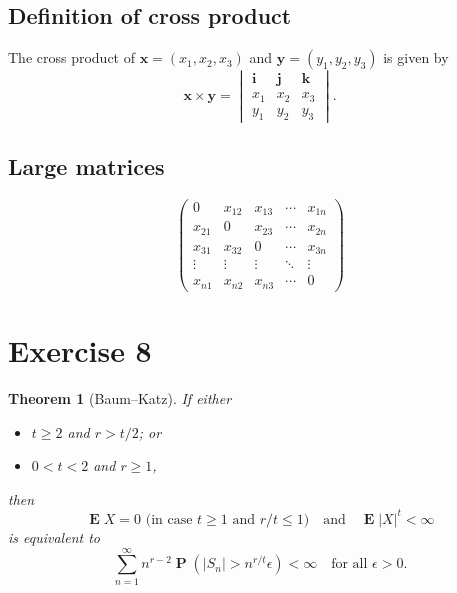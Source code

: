 \documentclass{amsart}
\DeclareMathOperator{\E}{\mathbf{E}}
\DeclareMathOperator{\PP}{\mathbf{P}}
\numberwithin{equation}{section}
\begin{document}
\subsection{Definition of cross product}
The cross product of $\mathbf{x}=(x_1,x_2,x_3)$ and $\mathbf{y}=(y_1,y_2,y_3)$
is given by
\[ \mathbf{x}\times\mathbf{y} = \begin{vmatrix}
\mathbf{i} & \mathbf{j} & \mathbf{k} \\
x_1 & x_2 & x_3 \\
y_1 & y_2 & y_3
\end{vmatrix}. \]

\subsection{Large matrices}
\[
\begin{pmatrix}
0 & x_{12} & x_{13} & \cdots & x_{1n} \\
x_{21} & 0 & x_{23} & \cdots & x_{2n} \\
x_{31} & x_{32} & 0 & \cdots & x_{3n} \\
\vdots & \vdots & \vdots & \ddots & \vdots \\
x_{n1} & x_{n2} & x_{n3} & \cdots & 0
\end{pmatrix}
\]


\section{Exercise 8}

\theoremstyle{plain}
\newtheorem{theorem}{Theorem}[section]
\newtheorem{corollary}[theorem]{Corollary}

\theoremstyle{remark}
\newtheorem{remark}{Remark}[section]

\begin{theorem}[Baum--Katz]
If either
\begin{itemize}
\item
$t \ge 2$ and $r > t/2$; or
\item
$0 < t < 2$ and $r \ge 1$,
\end{itemize}
then
\begin{equation} \label{eq:bk1}
\E X=0\text{ (in case $t\ge1$ and $r/t\le1$)} \quad\text{and}\quad
\E|X|^t < \infty
\end{equation}
is equivalent to
\begin{equation} \label{eq:bk2}
\sum_{n=1}^\infty n^{r-2}\PP(|S_n|>n^{r/t}\epsilon) < \infty
\quad \text{for all $\epsilon > 0$}.
\end{equation}
\end{theorem}
\end{document}
